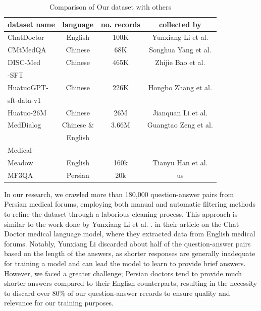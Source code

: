 \documentclass[conference]{IEEEtran}
\begin{document}
	\begin{table}[ht]
		\centering
		\caption{Comparison of Our dataset with others}
		\begin{tabular}{|l|c|c|c|}  %
			\hline
			dataset name            &language & no. records & collected by \\ \hline
			ChatDoctor 	   &English	 & 100K        & Yunxiang Li et al.
			\cite{b6}
			\\ \hline
			CMtMedQA  	   &Chinese	 & 68K        &  Songhua Yang et al.
			\cite{b21}
			\\ \hline
			DISC-Med	   &Chinese	 & 465K       & Zhijie Bao et al.   
			\cite{b22}
			\\ 
			-SFT       & &  &  \\ \hline
			HuatuoGPT-	   &Chinese	 & 226K        & Hongbo Zhang et al.   
			\cite{b23}
			\\ 
			sft-data-v1	   &	     &             & 	\\ \hline
			Huatuo-26M	   &Chinese	 & 26M         & Jianquan Li et al.
			\cite{b24}
			\\ \hline
			MedDialog       &Chinese \&&3.66M       & Guangtao Zeng et al.  \\ 
			&English  &             &  \cite{b25} \\ \hline
			Medical-       & &  &  \\
			Meadow  &English  & 160k        & Tianyu Han et al. 
			\cite{b26}
			\\ \hline
			MF3QA           &Persian  & 20k            & us \\ \hline
		\end{tabular}
		\label{tab:model_results_on_mcqa}
	\end{table}
	
	
	In our research, we crawled more than 180,000 question-answer pairs from Persian medical forums, employing both manual and automatic filtering methods to refine the dataset through a laborious cleaning process. This approach is similar to the work done by Yunxiang Li et al.
	\cite{b6}.
	in their article on the Chat Doctor medical language model, where they extracted data from English medical forums. Notably, Yunxiang Li discarded about half of the question-answer pairs based on the length of the answers, as shorter responses are generally inadequate for training a model and can lead the model to learn to provide brief answers. However, we faced a greater challenge; Persian doctors tend to provide much shorter answers compared to their English counterparts, resulting in the necessity to discard over 80\% of our question-answer records to ensure quality and relevance for our training purposes.
	
\end{document}
